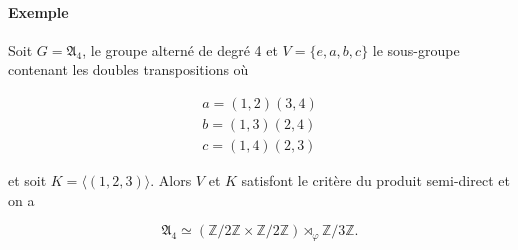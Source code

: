 \documentclass[french]{report}
\begin{document}
\paragraph{Exemple}

Soit $G = \mathfrak{A}_4$, le groupe alterné de degré 4 et $V = \{ e,a,b,c \} $ le sous-groupe contenant les doubles transpositions où

\begin{gather*}
  a = (1,2)(3,4) \\
  b = (1,3)(2,4) \\
  c = (1,4)(2,3)
\end{gather*}

et soit $K = \langle (1,2,3) \rangle $. Alors $V$ et $K$ satisfont le critère du produit semi-direct et on a

$$ \mathfrak{A}_4 \simeq (\mathbb{Z}/{ 2 }\mathbb{Z} \times \mathbb{Z}/{ 2 }\mathbb{Z}) \rtimes _{\varphi} \mathbb{Z}/{ 3 }\mathbb{Z}.$$
\end{document}
